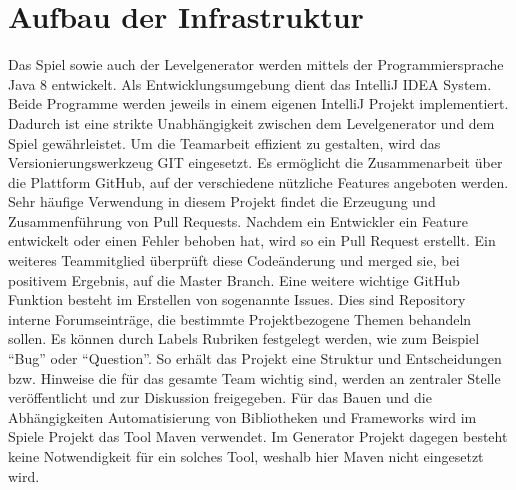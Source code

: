 \section{Aufbau der Infrastruktur}

Das Spiel sowie auch der Levelgenerator werden mittels der Programmiersprache Java 8 entwickelt. 
Als Entwicklungsumgebung dient das IntelliJ IDEA System. Beide Programme werden jeweils in einem eigenen IntelliJ Projekt implementiert. Dadurch ist eine strikte Unabhängigkeit zwischen dem Levelgenerator und dem Spiel gewährleistet.\newline
Um die Teamarbeit effizient zu gestalten, wird das Versionierungswerkzeug GIT eingesetzt. Es ermöglicht die Zusammenarbeit über die Plattform GitHub, auf der verschiedene nützliche Features angeboten werden. Sehr häufige Verwendung in diesem Projekt findet die Erzeugung und Zusammenführung von Pull Requests. Nachdem ein Entwickler ein Feature entwickelt oder einen Fehler behoben hat, wird so ein Pull Request erstellt. Ein weiteres Teammitglied überprüft diese Codeänderung und merged sie, bei positivem Ergebnis, auf die Master Branch.\newline
Eine weitere wichtige GitHub Funktion besteht im Erstellen von sogenannte Issues. Dies sind Repository interne Forumseinträge, die bestimmte Projektbezogene Themen behandeln sollen. Es können durch Labels Rubriken festgelegt werden, wie zum Beispiel ``Bug'' oder ``Question''. So erhält das Projekt eine Struktur und Entscheidungen bzw. Hinweise die für das gesamte Team wichtig sind, werden an zentraler Stelle veröffentlicht und zur Diskussion freigegeben.\newline
Für das Bauen und die Abhängigkeiten Automatisierung von Bibliotheken und Frameworks wird im Spiele Projekt das Tool Maven verwendet. Im Generator Projekt dagegen besteht keine Notwendigkeit für ein solches Tool, weshalb hier Maven nicht eingesetzt wird.\newline
